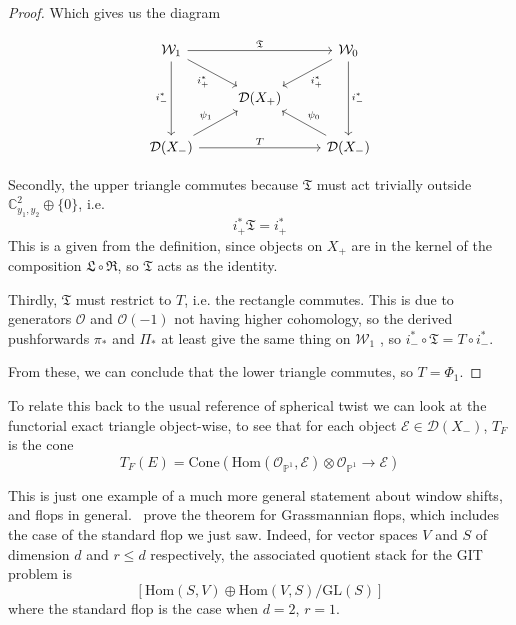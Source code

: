 \begin{proof}
Which gives us the diagram

\[\begin{tikzcd}
	{\mathcal{W}_1} && {\mathcal{W}_0} \\
	& {\mathcal{D}(X_+ )} \\
	{\mathcal{D}(X_- )} && {\mathcal{D}(X_- )}
	\arrow["{\mathfrak T}", from=1-1, to=1-3]
	\arrow["{i_+^*}"', from=1-1, to=2-2]
	\arrow["{i_- ^*}"', from=1-1, to=3-1]
	\arrow["{i_+^*}", from=1-3, to=2-2]
	\arrow["{i_- ^*}", from=1-3, to=3-3]
	\arrow["{\psi_1}", from=3-1, to=2-2]
	\arrow["T", from=3-1, to=3-3]
	\arrow["{\psi_0}"', from=3-3, to=2-2]
\end{tikzcd}\]

Secondly, the upper triangle commutes because $\mathfrak{T}$ must act trivially outside $\mathbb{C}^{2}_{y_{1},y_{2}}\oplus \{ 0 \}$, i.e. $$
i^{*}_{+}\mathfrak{T} = i^{*}_{+}
$$This is a given from the definition, since objects on $X_+$ are in the kernel of the composition $\mathfrak{L}\circ\mathfrak{R}$, so $\mathfrak{T}$ acts as the identity. 

Thirdly,  $\mathfrak{T}$ must restrict to $T$, i.e. the rectangle commutes. This is due to generators $\mathcal{O}$ and $\mathcal{O}(-1)$ not having higher cohomology, so the derived pushforwards $\pi_{*}$ and $\Pi_{*}$ at least give the same thing on $\mathcal{W}_1$ , so $i_{-}^{*}\circ \mathfrak{T} = T\circ i_{-}^{*}$. 

From these, we can conclude that the lower triangle commutes, so $T = \Phi_1$. 
\end{proof}

To relate this back to the usual reference of spherical twist we can look at the functorial exact triangle object-wise, to see that for each object $\mathcal{E}\in \mathcal{D}(X_-)$, $T_F$ is the cone $$
T_{F}(E) = \mathrm{Cone}\left( \mathrm{Hom}(\mathcal{O}_{\mathbb{P}^{1}},\mathcal{E}) \otimes  \mathcal{O}_{\mathbb{P}^{1}} \to \mathcal{E}\right) 
$$ 

\begin{remark}{}{}
	This is just one example of a much more general statement about window shifts, and flops in general.~\cite{donovan_window_2014} prove the theorem for Grassmannian flops, which includes the case of the standard flop we just saw. Indeed, for  vector spaces $V$ and $S$ of dimension $d$ and $r \leq d$ respectively, the associated quotient stack for the GIT problem is $$
	\left[ \mathrm{Hom} (S,V) \oplus \mathrm{Hom}(V,S)/\mathrm{GL}(S) \right] 
	$$where the standard flop is the case when $d = 2$, $r=1$.
	\end{remark}

